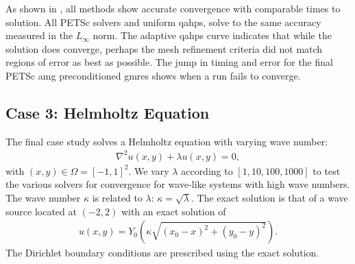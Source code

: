 As shown in , all methods show accurate convergence with comparable times to solution. All PETSc solvers and uniform \gls{qahps}, solve to the same accuracy measured in the $L_{\infty}$ norm. The adaptive \gls{qahps} curve indicates that while the solution does converge, perhaps the mesh refinement criteria did not match regions of error as best as possible. The jump in timing and error for the final PETSc \gls{amg} preconditioned \gls{gmres} shows when a run fails to converge.

\subsection{Case 3: Helmholtz Equation}
\label{sub:case3}

The final case study solves a Helmholtz equation with varying wave number:
\begin{align}
    \nabla^2 u(x,y) + \lambda u(x,y) = 0,
\end{align}
with $(x,y) \in \Omega = [-1, 1]^2$. We vary $\lambda$ according to $[1, 10, 100, 1000]$ to test the various solvers for convergence for wave-like systems with high wave numbers. The wave number $\kappa$ is related to $\lambda$: $\kappa = \sqrt{\lambda}$. The exact solution is that of a wave source located at $(-2, 2)$ with an exact solution of
\begin{align}
    u(x,y) = Y_0(\kappa \sqrt{(x_0 - x)^2 + (y_0 - y)^2}).
\end{align}
The Dirichlet boundary conditions are prescribed using the exact solution.

